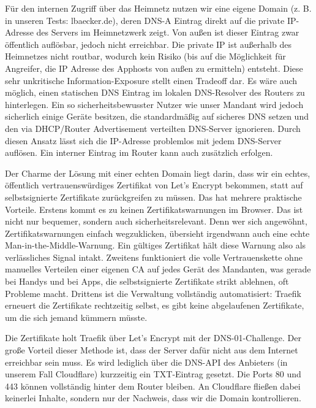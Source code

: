 Für den internen Zugriff über das Heimnetz nutzen wir eine eigene Domain (z. B. in unseren Tests: lbaecker.de), deren \ac{DNS}-A Eintrag direkt auf die private \ac{IP}-Adresse des Servers im Heimnetzwerk zeigt. Von außen ist dieser Eintrag zwar öffentlich auflösbar, jedoch nicht erreichbar. Die private \ac{IP} ist außerhalb des Heimnetzes nicht routbar, wodurch kein Risiko (bis auf die Möglichkeit für Angreifer, die \ac{IP} Adresse des Apphosts von außen zu ermitteln) entsteht. Diese sehr unkritische Information-Exposure stellt einen Tradeoff dar. Es wäre auch möglich, einen statischen \ac{DNS} Eintrag im lokalen \ac{DNS}-Resolver des Routers zu hinterlegen. Ein so sicherheitsbewusster Nutzer wie unser Mandant wird jedoch sicherlich einige Geräte besitzen, die standardmäßig auf sicheres \ac{DNS} setzen und den via \ac{DHCP}/Router Advertisement verteilten \ac{DNS}-Server ignorieren. Durch diesen Ansatz lässt sich die \ac{IP}-Adresse problemlos mit jedem \ac{DNS}-Server auflösen. Ein interner Eintrag im Router kann auch zusätzlich erfolgen.

Der Charme der Lösung mit einer echten Domain liegt darin, dass wir ein echtes, öffentlich vertrauenswürdiges Zertifikat von Let's Encrypt bekommen, statt auf selbstsignierte Zertifikate zurückgreifen zu müssen. Das hat mehrere praktische Vorteile. Erstens kommt es
zu keinen Zertifikatswarnungen im Browser. Das ist nicht nur bequemer, sondern
auch sicherheitsrelevant. Denn wer sich angewöhnt, Zertifikatswarnungen einfach
wegzuklicken, übersieht irgendwann auch eine echte Man-in-the-Middle-Warnung.
Ein gültiges Zertifikat hält diese Warnung also als verlässliches Signal intakt.
Zweitens funktioniert die volle Vertrauenskette ohne manuelles Verteilen einer
eigenen \ac{CA} auf jedes Gerät des Mandanten, was gerade bei Handys und bei Apps, die selbstsignierte Zertifikate strikt ablehnen, oft
Probleme macht. Drittens ist die Verwaltung vollständig automatisiert: Traefik
erneuert die Zertifikate rechtzeitig selbst, es gibt keine abgelaufenen
Zertifikate, um die sich jemand kümmern müsste.

Die Zertifikate holt Traefik über Let's Encrypt mit der \ac{DNS}-01-Challenge. Der
große Vorteil dieser Methode ist, dass der Server dafür nicht aus dem Internet
erreichbar sein muss. Es wird lediglich über die \ac{DNS}-\ac{API} des Anbieters
(in unserem Fall Cloudflare) kurzzeitig ein TXT-Eintrag gesetzt. Die Ports 80
und 443 können vollständig hinter dem Router bleiben. An Cloudflare fließen
dabei keinerlei Inhalte, sondern nur der Nachweis, dass wir die Domain
kontrollieren.

